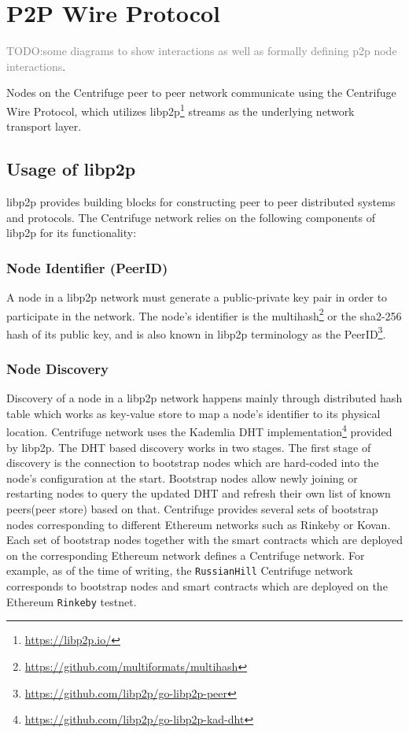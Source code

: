 \section{P2P Wire Protocol}

\textcolor{gray}{TODO:some diagrams to show interactions as well as formally defining p2p node interactions}.

Nodes on the Centrifuge peer to peer network communicate using the Centrifuge Wire Protocol, which utilizes libp2p\footnote{\url{https://libp2p.io/}} streams as the underlying network transport layer.

\subsection{Usage of libp2p}
libp2p provides building blocks for constructing peer to peer distributed systems and protocols. The Centrifuge network relies on the following components of libp2p for its functionality: 

\subsubsection{Node Identifier (PeerID)} \label{sec:node_id}
A node in a libp2p network must generate a public-private key pair in order to participate in the network. The node's identifier is the multihash\footnote{\url{https://github.com/multiformats/multihash}} or the sha2-256 hash of its public key, and is also known in libp2p terminology as the PeerID\footnote{\url{https://github.com/libp2p/go-libp2p-peer}}. 

\subsubsection{Node Discovery}
Discovery of a node in a libp2p network happens mainly through distributed hash table which works as key-value store to map a node's identifier to its physical location. Centrifuge network uses the Kademlia DHT implementation\footnote{\url{https://github.com/libp2p/go-libp2p-kad-dht}} provided by libp2p. The DHT based discovery works in two stages. The first stage of discovery is the connection to bootstrap nodes which are hard-coded into the node's configuration at the start. Bootstrap nodes allow newly joining or restarting nodes to query the updated DHT and refresh their own list of known peers(peer store) based on that. Centrifuge provides several sets of bootstrap nodes corresponding to different Ethereum networks such as Rinkeby or Kovan. Each set of bootstrap nodes together with the smart contracts which are deployed on the corresponding Ethereum network defines a Centrifuge network. For example, as of the time of writing, the \texttt{RussianHill} Centrifuge network corresponds to bootstrap nodes and smart contracts which are deployed on the Ethereum \texttt{Rinkeby} testnet. 

